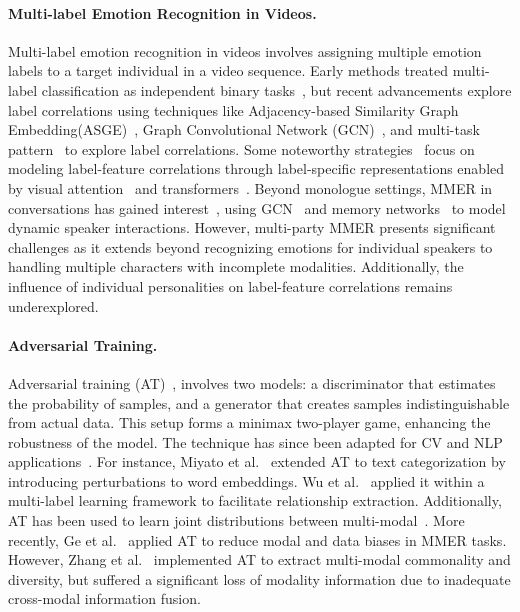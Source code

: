 \paragraph{Multi-label Emotion Recognition in Videos.}
Multi-label emotion recognition in videos involves assigning multiple emotion labels to a target individual in a video sequence. Early methods treated multi-label classification as independent binary tasks~\cite{boutell2004learning}, but recent advancements explore label correlations using techniques like Adjacency-based Similarity Graph Embedding(ASGE)~\cite{ASGE}, Graph Convolutional Network (GCN)~\cite{chen2019multi}, and multi-task pattern~\cite{tsai2020order} to explore label correlations. Some noteworthy strategies~\cite {zhang2021bilabel,Tailor} focus on modeling label-feature correlations through label-specific representations enabled by visual attention~\cite{chen2019multi} and transformers~\cite{Tailor}. Beyond monologue settings, MMER in conversations has gained interest~\cite{MELD}, using GCN~\cite{Dialoguegcn} and memory networks~\cite{memory_network} to model dynamic speaker interactions. However, multi-party MMER presents significant challenges as it extends beyond recognizing emotions for individual speakers to handling multiple characters with incomplete modalities. Additionally, the influence of individual personalities on label-feature correlations remains underexplored.

\paragraph{Adversarial Training.}
Adversarial training (AT)~\cite{GAN}, involves two models: a discriminator that estimates the probability of samples, and a generator that creates samples indistinguishable from actual data. This setup forms a minimax two-player game, enhancing the robustness of the model. The technique has since been adapted for CV and NLP applications~\cite{GAN_survey}. For instance, Miyato et al.~\cite{miyato2016adversarial} extended AT to text categorization by introducing perturbations to word embeddings. Wu et al.~\cite{adversarial_relation_extraction} applied it within a multi-label learning framework to facilitate relationship extraction. Additionally, AT has been used to learn joint distributions between multi-modal~\cite{tsai2018learning}. More recently, Ge et al.~\cite{adversarial_masking} applied AT to reduce modal and data biases in MMER tasks. However, Zhang et al.~\cite{Tailor} implemented AT to extract multi-modal commonality and diversity, but suffered a significant loss of modality information due to inadequate cross-modal information fusion.
